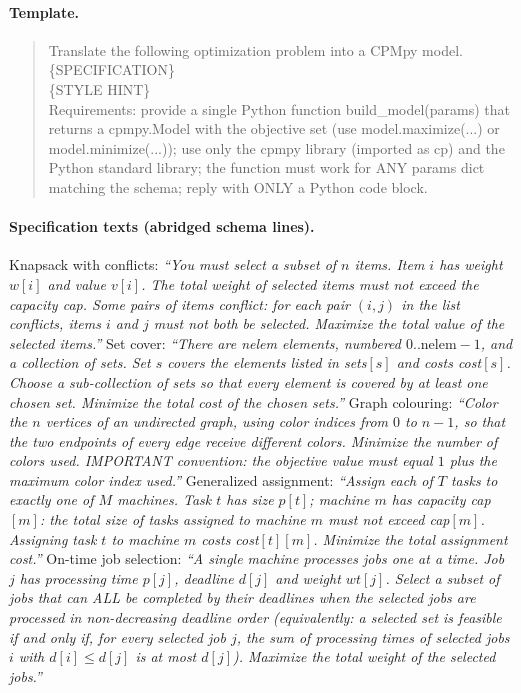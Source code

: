 \documentclass[pdflatex,sn-mathphys-num]{sn-jnl}
\theoremstyle{thmstyleone}
\theoremstyle{thmstyletwo}
\begin{document}
\begin{appendices}
\paragraph{Template.}
\begin{quote}\small\ttfamily
Translate the following optimization problem into a CPMpy model.\\[2pt]
\{SPECIFICATION\}\\[2pt]
\{STYLE HINT\}\\[2pt]
Requirements: provide a single Python function build\_model(params)
that returns a cpmpy.Model with the objective set (use
model.maximize(...) or model.minimize(...)); use only the cpmpy
library (imported as cp) and the Python standard library; the
function must work for ANY params dict matching the schema; reply
with ONLY a Python code block.
\end{quote}

\paragraph{Specification texts (abridged schema lines).}
Knapsack with conflicts: \emph{``You must select a subset of $n$
items. Item $i$ has weight $w[i]$ and value $v[i]$. The total weight
of selected items must not exceed the capacity cap. Some pairs of
items conflict: for each pair $(i,j)$ in the list conflicts, items
$i$ and $j$ must not both be selected. Maximize the total value of
the selected items.''} Set cover: \emph{``There are nelem elements,
numbered $0..\mathrm{nelem}-1$, and a collection of sets. Set $s$
covers the elements listed in sets$[s]$ and costs cost$[s]$. Choose a
sub-collection of sets so that every element is covered by at least
one chosen set. Minimize the total cost of the chosen sets.''} Graph
colouring: \emph{``Color the $n$ vertices of an undirected graph,
using color indices from $0$ to $n-1$, so that the two endpoints of
every edge receive different colors. Minimize the number of colors
used. IMPORTANT convention: the objective value must equal $1$ plus
the maximum color index used.''} Generalized assignment:
\emph{``Assign each of $T$ tasks to exactly one of $M$ machines. Task
$t$ has size $p[t]$; machine $m$ has capacity cap$[m]$: the total
size of tasks assigned to machine $m$ must not exceed cap$[m]$.
Assigning task $t$ to machine $m$ costs cost$[t][m]$. Minimize the
total assignment cost.''} On-time job selection: \emph{``A single
machine processes jobs one at a time. Job $j$ has processing time
$p[j]$, deadline $d[j]$ and weight $wt[j]$. Select a subset of jobs
that can ALL be completed by their deadlines when the selected jobs
are processed in non-decreasing deadline order (equivalently: a
selected set is feasible if and only if, for every selected job $j$,
the sum of processing times of selected jobs $i$ with
$d[i] \le d[j]$ is at most $d[j]$). Maximize the total weight of the
selected jobs.''}


\end{appendices}
\end{document}
